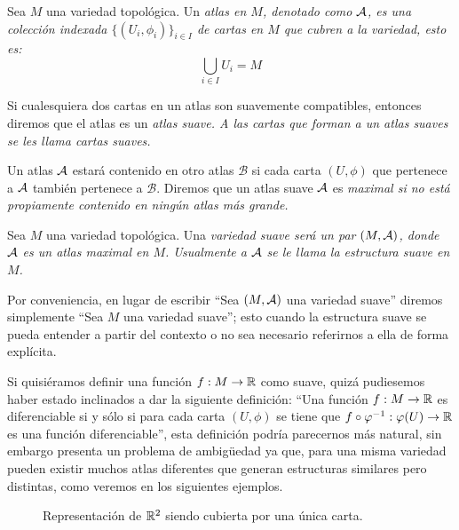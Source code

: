\begin{definition}\label{Definición: Atlas}
	Sea $M$ una variedad topológica. Un \it{atlas} en $M$, denotado como $\mathcal{A}$, es una colección indexada $\{(U_i,\phi_i)\}_{i\in I}$ de cartas en $M$ que cubren a la variedad, esto es:
	\[\bigcup_{i \in I} U_i = M \]

	Si cualesquiera dos cartas en un atlas son suavemente compatibles, entonces diremos que el atlas es un \it{atlas suave}. A las cartas que forman a un atlas suaves se les llama \it{cartas suaves}.

	Un atlas $\mathcal{A}$ estará contenido en otro atlas $\mathcal{B}$ si cada carta $(U,\phi)$ que pertenece a $\mathcal{A}$ también pertenece a $\mathcal{B}$. Diremos que un atlas suave $\mathcal{A}$ es \it{maximal} si no está propiamente contenido en ningún atlas más grande.
\end{definition}

\begin{definition}\label{Definición: Variedad Suave}
	Sea $M$ una variedad topológica. Una \it{variedad suave} será un par $(M, \mathcal{A})$, donde $\mathcal{A}$ es un atlas maximal en $M$. Usualmente a $\mathcal{A}$ se le llama la \it{estructura suave} en $M$.
\end{definition}

Por conveniencia, en lugar de escribir \enquote{Sea $(M,\mathcal{A})$ una variedad suave} diremos simplemente \enquote{Sea $M$ una variedad suave}; esto cuando la estructura suave se pueda entender a partir del contexto o no sea necesario referirnos a ella de forma explícita.


Si quisiéramos definir una función $f: M \to \mathbb{R}$ como suave, quizá pudiesemos haber estado inclinados a dar la siguiente definición: \enquote{Una función $f: M \to \mathbb{R}$ es diferenciable si y sólo si para cada carta $(U,\phi)$ se tiene que $f\circ \varphi^{-1}: \varphi(U) \to \mathbb{R}$ es una función diferenciable}, esta definición podría parecernos más natural, sin embargo presenta un problema de ambigüedad ya que, para una misma variedad pueden existir muchos atlas diferentes que generan estructuras similares pero distintas, como veremos en los siguientes ejemplos.

\begin{figure}[h]
	\begin{center}
		
		\caption{Representación de $\mathbb{R}^2$ siendo cubierta por una única carta.}
	\end{center}
\end{figure}

